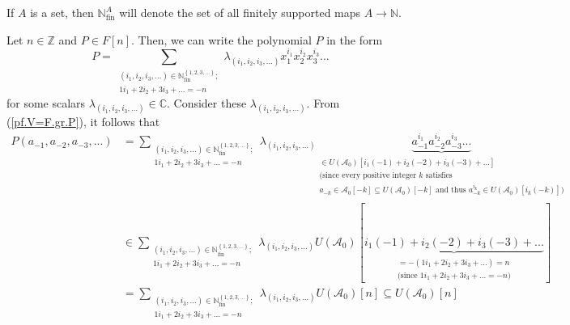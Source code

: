 \documentclass[etingof-lie.tex]{subfiles}
\begin{document}
If $A$ is a set, then $\mathbb{N}_{\operatorname*{fin}}^{A}$ will denote the
set of all finitely supported maps $A\rightarrow\mathbb{N}$.

Let $n\in\mathbb{Z}$ and $P\in F\left[  n\right]  $. Then, we can write the
polynomial $P$ in the form
\begin{equation}
P=\sum\limits_{\substack{\left(  i_{1},i_{2},i_{3},...\right)  \in
\mathbb{N}_{\operatorname*{fin}}^{\left\{  1,2,3,...\right\}  };\\1i_{1}%
+2i_{2}+3i_{3}+...=-n}}\lambda_{\left(  i_{1},i_{2},i_{3},...\right)  }%
x_{1}^{i_{1}}x_{2}^{i_{2}}x_{3}^{i_{3}}... \label{pf.V=F.gr.P}%
\end{equation}
for some scalars $\lambda_{\left(  i_{1},i_{2},i_{3},...\right)  }%
\in\mathbb{C}$. Consider these $\lambda_{\left(  i_{1},i_{2},i_{3},...\right)
}$. From (\ref{pf.V=F.gr.P}), it follows that%
\begin{align*}
P\left(  a_{-1},a_{-2},a_{-3},...\right)   &  =\sum\limits_{\substack{\left(
i_{1},i_{2},i_{3},...\right)  \in\mathbb{N}_{\operatorname*{fin}}^{\left\{
1,2,3,...\right\}  };\\1i_{1}+2i_{2}+3i_{3}+...=-n}}\lambda_{\left(
i_{1},i_{2},i_{3},...\right)  }\underbrace{a_{-1}^{i_{1}}a_{-2}^{i_{2}}%
a_{-3}^{i_{3}}...}_{\substack{\in U\left(  \mathcal{A}_{0}\right)  \left[
i_{1}\left(  -1\right)  +i_{2}\left(  -2\right)  +i_{3}\left(  -3\right)
+...\right]  \\\text{(since every positive integer }k\text{ satisfies}%
\\a_{-k}\in\mathcal{A}_{0}\left[  -k\right]  \subseteq U\left(  \mathcal{A}%
_{0}\right)  \left[  -k\right]  \text{ and thus }a_{-k}^{i_{k}}\in U\left(
\mathcal{A}_{0}\right)  \left[  i_{k}\left(  -k\right)  \right]  \text{)}}}\\
&  \in\sum\limits_{\substack{\left(  i_{1},i_{2},i_{3},...\right)
\in\mathbb{N}_{\operatorname*{fin}}^{\left\{  1,2,3,...\right\}  }%
;\\1i_{1}+2i_{2}+3i_{3}+...=-n}}\lambda_{\left(  i_{1},i_{2},i_{3},...\right)
}U\left(  \mathcal{A}_{0}\right)  \left[  \underbrace{i_{1}\left(  -1\right)
+i_{2}\left(  -2\right)  +i_{3}\left(  -3\right)  +...}_{\substack{=-\left(
1i_{1}+2i_{2}+3i_{3}+...\right)  =n\\\text{(since }1i_{1}+2i_{2}%
+3i_{3}+...=-n\text{)}}}\right] \\
&  =\sum\limits_{\substack{\left(  i_{1},i_{2},i_{3},...\right)  \in
\mathbb{N}_{\operatorname*{fin}}^{\left\{  1,2,3,...\right\}  };\\1i_{1}%
+2i_{2}+3i_{3}+...=-n}}\lambda_{\left(  i_{1},i_{2},i_{3},...\right)
}U\left(  \mathcal{A}_{0}\right)  \left[  n\right]  \subseteq U\left(
\mathcal{A}_{0}\right)  \left[  n\right]
\end{align*}
\end{document}
